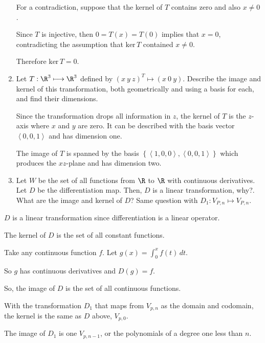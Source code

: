 \documentclass{article}
\begin{document}
\begin{enumerate}[label= (\alph*)]
  For a contradiction, suppose that the kernel of $T$ contains zero and also $x\neq 0$. 

  Since  $T$ is injective, then  $0=T(x)=T(0)$ implies that $x=0$, contradicting the assumption that $\text{ker}\,T$ contained $x\neq 0$. 

  Therefore $\text{ker}\,T={0}$.

  \item Let $T:\R^{3}\longmapsto\R^{3}$ defined by ${(x\ y\ z)}^{T}\longmapsto(x\ 0\ y)$. Describe the image and kernel of this transformation, both geometrically and using a basis for each, and find their dimensions.

Since the transformation drops all information in $z$, the kernel of $T $ is the $z$-axis where $x$ and $y$ are zero. It can be described with the basis vector $\left<0,0,1 \right>$ and has dimension one. 

The image of $T$ is spanned by the basis $\left\{ \left<1,0,0 \right>,\left<0,0,1 \right> \right\} $ which produces the $xz$-plane and has dimension two. 

  \item Let $W$ be the set of all functions from $\R$ to $\R$ with continuous derivatives. Let $D$ be the differentiation map. Then, $D$ is a linear transformation, why?. What are the image and kernel of $D$? Same question with $D_1:V_{P,n}\longmapsto V_{P,n}$.
\end{enumerate}

$D$ is a linear transformation since differentiation is a linear operator. 

The kernel of  $D$ is the set of all constant functions. 

Take any continuous function $f$. Let $g(x)=\int_{0}^{x} f(t)\,dt $. 

So $g$ has continuous derivatives and $D(g)=f$. 

So, the image of $D$ is the set of all continuous functions. 


With the transformation $D_1$ that maps from $V_{p,n}$ as the domain and codomain, the kernel is the same as $D$ above, ${V_{p,0}}$.

The image of $D_1$ is one ${V_{p,n-1}}$, or the polynomials of a degree one less than $n$. 
\end{document}
